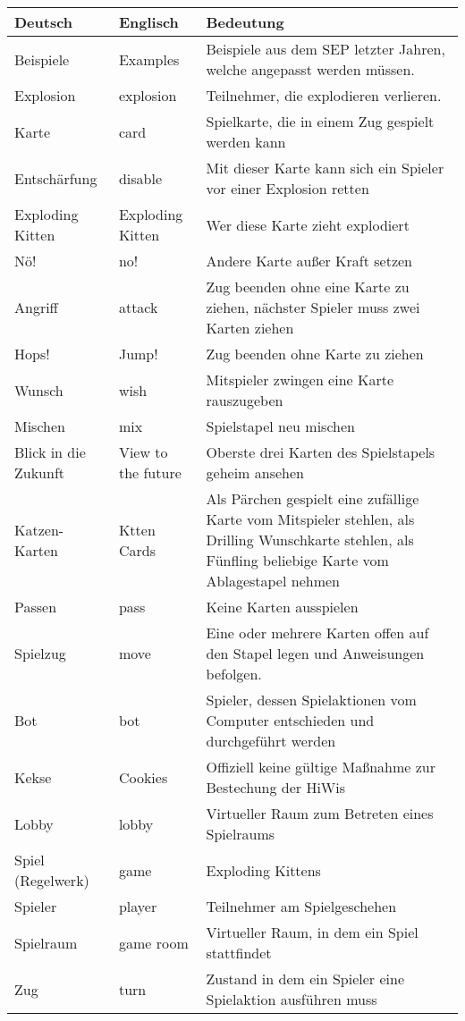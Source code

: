\begin{center}
		\begin{longtable}{p{} p{} p{}}
			\textbf{Deutsch} & \textbf{Englisch} & \textbf{Bedeutung} \\
			\hline \hline \endhead
			Beispiele & Examples & Beispiele aus dem SEP letzter Jahren, welche angepasst werden müssen.\\
			Explosion & explosion & Teilnehmer, die explodieren verlieren. \\    
			Karte & card & Spielkarte, die in einem Zug gespielt werden kann\\
			Entschärfung & disable & Mit dieser Karte kann sich ein Spieler vor einer Explosion retten\\
			Exploding Kitten & Exploding Kitten & Wer diese Karte zieht explodiert\\
			Nö! & no! & Andere Karte außer Kraft setzen\\
			Angriff & attack & Zug beenden ohne eine Karte zu ziehen, nächster Spieler muss zwei Karten ziehen\\
			Hops! & Jump! & Zug beenden ohne Karte zu ziehen\\
			Wunsch & wish & Mitspieler zwingen eine Karte rauszugeben\\
			Mischen & mix & Spielstapel neu mischen\\
			Blick in die Zukunft & View to the future & Oberste drei Karten des Spielstapels geheim ansehen\\
			Katzen-Karten & Ktten Cards & Als Pärchen gespielt eine zufällige Karte vom Mitspieler stehlen, als Drilling Wunschkarte stehlen, als Fünfling beliebige Karte vom Ablagestapel nehmen\\
			
			Passen & pass & Keine Karten ausspielen\\
			Spielzug & move & Eine oder mehrere Karten offen auf den Stapel legen und Anweisungen befolgen. \\
			                
			Bot & bot & Spieler, dessen Spielaktionen vom Computer entschieden und durchgeführt werden\\
			Kekse & Cookies & Offiziell keine gültige Maßnahme zur Bestechung der HiWis\\          
 			Lobby & lobby & Virtueller Raum zum Betreten eines Spielraums\\	
			Spiel (Regelwerk) & game & Exploding Kittens \\
			Spieler & player & Teilnehmer am Spielgeschehen\\
			Spielraum & game room & Virtueller Raum, in dem ein Spiel stattfindet\\
			Zug & turn & Zustand in dem ein Spieler eine Spielaktion ausführen muss\\
		\end{longtable}
\end{center}


